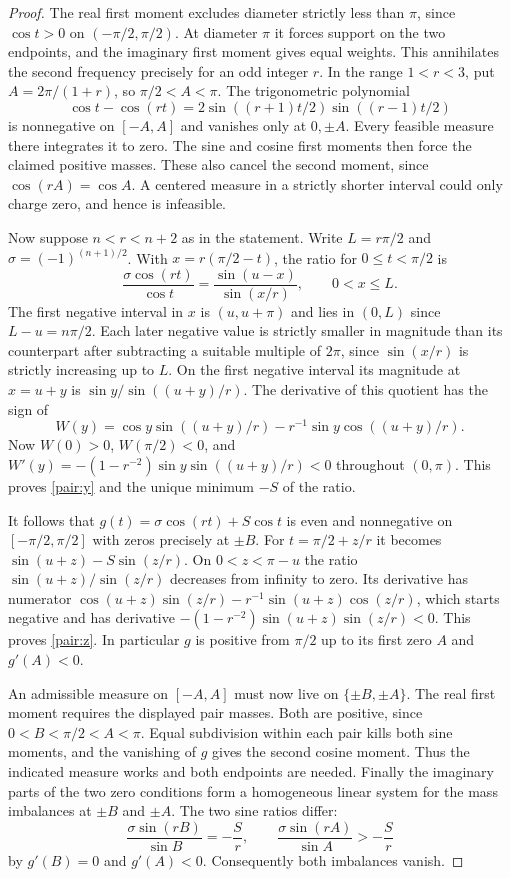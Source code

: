 \documentclass[11pt,letterpaper]{article}
\theoremstyle{remark}\newtheorem{remark}[theorem]{Remark}
\begin{document}
\begin{proof}
The real first moment excludes diameter strictly less than $\pi$, since
$\cos t>0$ on $(-\pi/2,\pi/2)$. At diameter $\pi$ it forces support
on the two endpoints, and the imaginary first moment gives equal
weights. This annihilates the second frequency precisely for an odd integer
$r$. In the range $1<r<3$, put $A=2\pi/(1+r)$, so $\pi/2<A<\pi$.
The trigonometric polynomial
\[
 \cos t-\cos(rt)=2\sin((r+1)t/2)\sin((r-1)t/2)
\]
is nonnegative on $[-A,A]$ and vanishes only at $0,\pm A$. Every
feasible measure there integrates it to zero. The sine and cosine first
moments then force the claimed positive masses. These also cancel the
second moment, since $\cos(rA)=\cos A$. A centered measure in a strictly
shorter interval could only charge zero, and hence is infeasible.

Now suppose $n<r<n+2$ as in the statement. Write
$L=r\pi/2$ and $\sigma=(-1)^{(n+1)/2}$. With
$x=r(\pi/2-t)$, the ratio for $0\le t<\pi/2$ is
\[
 \frac{\sigma\cos(rt)}{\cos t}
   =\frac{\sin(u-x)}{\sin(x/r)},\qquad 0<x\le L .
\]
The first negative interval in $x$ is $(u,u+\pi)$ and lies in
$(0,L)$ since $L-u=n\pi/2$. Each later negative value is strictly
smaller in magnitude than its counterpart after subtracting a suitable
multiple of $2\pi$, since $\sin(x/r)$ is strictly increasing up to
$L$. On the first negative interval its magnitude at $x=u+y$ is
$\sin y/\sin((u+y)/r)$. The derivative of this quotient has the
sign of
\[
 W(y)=\cos y\sin((u+y)/r)-r^{-1}\sin y\cos((u+y)/r).
\]
Now $W(0)>0$, $W(\pi/2)<0$, and
$W'(y)=-(1-r^{-2})\sin y\sin((u+y)/r)<0$ throughout $(0,\pi)$.
This proves \eqref{pair:y} and the unique minimum $-S$ of the ratio.

It follows that $g(t)=\sigma\cos(rt)+S\cos t$ is even and nonnegative
on $[-\pi/2,\pi/2]$ with zeros precisely at $\pm B$.
For $t=\pi/2+z/r$ it becomes
$\sin(u+z)-S\sin(z/r)$. On $0<z<\pi-u$ the ratio
$\sin(u+z)/\sin(z/r)$ decreases from infinity to zero. Its derivative
has numerator
$\cos(u+z)\sin(z/r)-r^{-1}\sin(u+z)\cos(z/r)$, which starts negative
and has derivative $-(1-r^{-2})\sin(u+z)\sin(z/r)<0$.
This proves \eqref{pair:z}. In particular $g$ is positive from
$\pi/2$ up to its first zero $A$ and $g'(A)<0$.

An admissible measure on $[-A,A]$ must now live on $\{\pm B,\pm A\}$.
The real first moment requires the displayed pair masses. Both are
positive, since $0<B<\pi/2<A<\pi$. Equal subdivision within each
pair kills both sine moments, and the vanishing of $g$ gives the second
cosine moment. Thus the indicated measure works and both endpoints are
needed. Finally the imaginary parts of the two zero conditions form a
homogeneous linear system for the mass imbalances at $\pm B$ and
$\pm A$. The two sine ratios differ:
\[
 \frac{\sigma\sin(rB)}{\sin B}=-\frac Sr,
 \qquad
 \frac{\sigma\sin(rA)}{\sin A}>-\frac Sr
\]
by $g'(B)=0$ and $g'(A)<0$. Consequently both imbalances vanish.
\end{proof}
\end{document}
